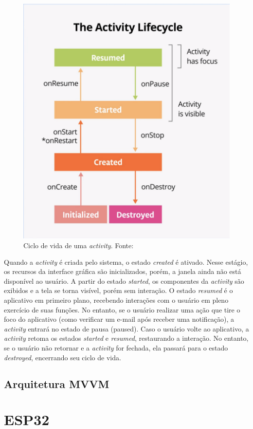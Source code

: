 \begin{figure}[ht]
    \centering
    \includegraphics[width=.37\textwidth]{img/activity-lifecycle.png}
    \caption{Ciclo de vida de uma \textit{activity}. Fonte:\cite{google-developers-activity-lifecycle}}\label{figActivityLifeCycle}
\end{figure}

Quando a \textit{activity} é criada pelo sistema, o estado \textit{created} é ativado. Nesse estágio, os recursos da interface gráfica 
são inicializados, porém, a janela ainda não está disponível ao usuário. A partir do estado \textit{started}, os componentes da \textit{activity} são exibidos e a tela se torna visível, porém sem interação.
O estado \textit{resumed} é o aplicativo em primeiro plano, recebendo interações com o usuário em pleno exercício de suas funções. No entanto, se o usuário realizar uma ação que tire 
o foco do aplicativo (como verificar um e-mail após receber uma notificação), a \textit{activity} entrará no estado de pausa (paused).
Caso o usuário volte ao aplicativo, a \textit{activity} retoma os estados \textit{started} e \textit{resumed}, restaurando a interação. No entanto, se o usuário não retornar e a \textit{activity} for fechada, 
ela passará para o estado \textit{destroyed}, encerrando seu ciclo de vida.

\subsection{Arquitetura MVVM}

\section{ESP32}